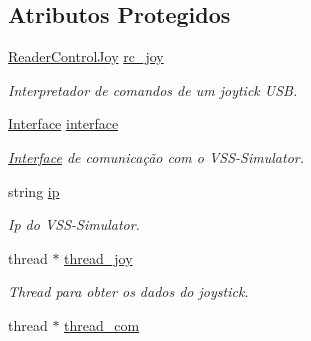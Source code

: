 \subsection*{Atributos Protegidos}
\begin{DoxyCompactItemize}
\item 
\hyperlink{classReaderControlJoy}{Reader\+Control\+Joy} \hyperlink{classCore_a21f63c0f0f6fd2b4b45b2217d9069116}{rc\+\_\+joy}\hypertarget{classCore_a21f63c0f0f6fd2b4b45b2217d9069116}{}\label{classCore_a21f63c0f0f6fd2b4b45b2217d9069116}

\begin{DoxyCompactList}\small\item\em Interpretador de comandos de um joytick U\+SB. \end{DoxyCompactList}\item 
\hyperlink{classInterface}{Interface} \hyperlink{classCore_a69d2a2f913b4a1832516e5752c655c97}{interface}\hypertarget{classCore_a69d2a2f913b4a1832516e5752c655c97}{}\label{classCore_a69d2a2f913b4a1832516e5752c655c97}

\begin{DoxyCompactList}\small\item\em \hyperlink{classInterface}{Interface} de comunicação com o V\+S\+S-\/\+Simulator. \end{DoxyCompactList}\item 
string \hyperlink{classCore_a8b79534f9c58257910e3fce2ad36c7e2}{ip}\hypertarget{classCore_a8b79534f9c58257910e3fce2ad36c7e2}{}\label{classCore_a8b79534f9c58257910e3fce2ad36c7e2}

\begin{DoxyCompactList}\small\item\em Ip do V\+S\+S-\/\+Simulator. \end{DoxyCompactList}\item 
thread $\ast$ \hyperlink{classCore_ac4b1994dc99b1b5ccc6573f6beb0e27f}{thread\+\_\+joy}\hypertarget{classCore_ac4b1994dc99b1b5ccc6573f6beb0e27f}{}\label{classCore_ac4b1994dc99b1b5ccc6573f6beb0e27f}

\begin{DoxyCompactList}\small\item\em Thread para obter os dados do joystick. \end{DoxyCompactList}\item 
thread $\ast$ \hyperlink{classCore_a6e002cd17fe42a38d8d33e3d6ef845d9}{thread\+\_\+com}\hypertarget{classCore_a6e002cd17fe42a38d8d33e3d6ef845d9}{}\label{classCore_a6e002cd17fe42a38d8d33e3d6ef845d9}


\end{DoxyCompactItemize}
